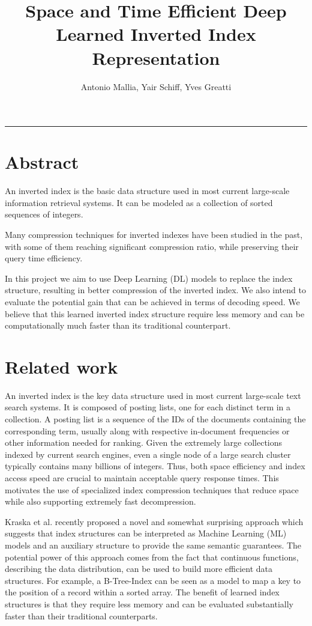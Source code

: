 \documentclass{article}
\title{Space and Time Efficient Deep Learned Inverted Index Representation}
\author{Antonio Mallia, Yair Schiff, Yves Greatti}
\date{}
\begin{document}
\maketitle

\noindent\rule{\textwidth}{0.4pt}


\section*{Abstract}
An inverted index is the basic data structure used in most current large-scale information retrieval systems.
It can be modeled as a collection of sorted sequences of integers.

Many compression techniques for inverted indexes have been studied in the past, with some of them reaching significant compression ratio, while preserving their query time efficiency.

In this project we aim to use Deep Learning (DL) models to replace the index structure, resulting in better compression of the inverted index.
We also intend to evaluate the potential gain that can be achieved in terms of decoding speed.
We believe that this learned inverted index structure require less memory and can be computationally much faster than its traditional counterpart.

\section{Related work}
An inverted index is the key data structure used in most current large-scale text search systems.
It is composed of posting lists, one for each distinct term in a collection.
A posting list is a sequence of the IDs of the documents containing the corresponding term, usually along with respective in-document frequencies or other information needed for ranking.
Given the extremely large collections indexed by current search engines, even a single node of a large search cluster typically contains many billions of integers.
Thus, both space efficiency and index access speed are crucial to maintain acceptable query response times.
This motivates the use of specialized index compression techniques that reduce space while also supporting extremely fast decompression.

Kraska et al. \cite{Kraska2018} recently proposed a novel and somewhat surprising approach which suggests that index structures can be interpreted as Machine Learning (ML) models and an auxiliary structure to provide the same semantic guarantees. 
The potential power of this approach comes from the fact that continuous functions, describing the data distribution, can be used to build more efficient data structures. For example, a B-Tree-Index can be seen as a model to map a key to the position of a record within a sorted array.
The benefit of learned index structures is that they require less memory and can be evaluated substantially faster than their traditional counterparts.
\end{document}

